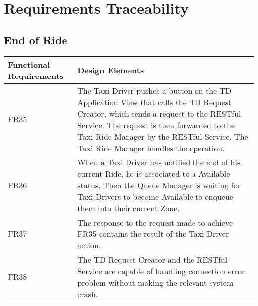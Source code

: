 \section{Requirements Traceability}
\subsection{End of Ride}
\begin{tabulary}{\linewidth}{L|L}
	Functional Requirements & Design Elements \\
	\hline
	\hline
	FR35         & 
	The Taxi Driver pushes a button on the TD Application View that calls the TD Request Creator, which sends a request to the RESTful Service. The request is then forwarded to the Taxi Ride Manager by the RESTful Service. The Taxi Ride Manager handles the operation. \\
	\hline
	FR36         &
	When a Taxi Driver has notified the end of his current Ride, he is associated to a Available status. Then the Queue Manager is waiting for Taxi Drivers to become Available to enqueue them into their current Zone. \\
	\hline
	FR37         &
	The response to the request made to achieve FR35 contains the result of the Taxi Driver action. \\
	\hline
	FR38         &
	The TD Request Creator and the RESTful Service are capable of handling connection error problem without making the relevant system crash. \\
	\hline
\end{tabulary} 